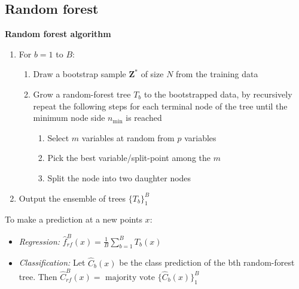 \documentclass[a4, english]{article}
\begin{document}
\newpage

\subsection{Random forest}
\begin{framed}
\begin{center}  
  \textbf{Random forest algorithm}
\end{center}
\begin{enumerate}
  \item For $b = 1$ to $B$:
  \begin{enumerate}
    \item Draw a bootstrap sample $\pmb Z^*$ of size $N$ from the training data
    \item Grow a random-forest tree $T_b$ to the bootstrapped data, by recursively repeat the following steps for each terminal node of the tree until the minimum node side $n_\text{min}$ is reached  
    \begin{enumerate}
      \item Select $m$ variables at random from $p$ variables 
      \item Pick the best variable/split-point among the $m$
      \item Split the node into two daughter nodes
    \end{enumerate}    
  \end{enumerate} 
  \item Output the ensemble of trees $\{T_b\}_1^B$ 
\end{enumerate} 
To make a prediction at a new points $x$:
\begin{itemize}
  \item \textit{Regression:} $\hat f_{rf}^B(x)= \frac1B \sum_{b=1}^BT_b(x)$
  \item \textit{Classification:} Let $\hat C_b(x)$ be the class prediction of the bth random-forest tree. Then $\hat C_{rf}^B(x) = \text{ majority vote } \{\hat C_b(x)\}_1^B$ 
\end{itemize}
\end{framed}
\end{document}
